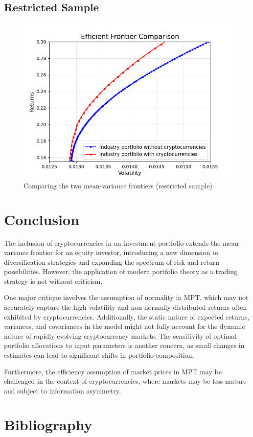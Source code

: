 \documentclass[12pt,a4paper]{article}
\begin{document}
\subsection{Restricted Sample}\label{sec:restricted sample}
\begin{figure}[H]
    \centering
    \includegraphics[width=1\linewidth]{Figures/Efficient_Frontier_Comparison_Bull_Market.png}
    \caption{Comparing the two mean-variance frontiers (restricted sample)}
    \label{fig:restricted}
\end{figure}

\section{Conclusion}\label{sec:discussion}
The inclusion of cryptocurrencies in an investment portfolio extends the mean-variance frontier for an equity investor, 
introducing a new dimension to diversification strategies and expanding the spectrum of risk and return possibilities. 
However, the application of modern portfolio theory as a trading strategy is not without criticism. 

\noindent One major critique involves the assumption of normality in MPT, which may not accurately capture the high 
volatility and non-normally distributed returns often exhibited by cryptocurrencies. Additionally, the static nature 
of expected returns, variances, and covariances in the model might not fully account for the dynamic nature of rapidly 
evolving cryptocurrency markets. The sensitivity of optimal portfolio allocations to input parameters is another concern, 
as small changes in estimates can lead to significant shifts in portfolio composition.

\noindent Furthermore, the efficiency assumption of market prices in MPT may be challenged in the context of cryptocurrencies, 
where markets may be less mature and subject to information asymmetry.

\section{Bibliography}\label{sec:bibliography}



\end{document}

